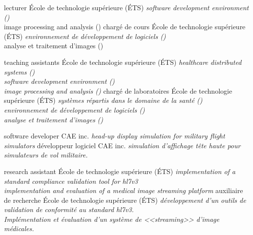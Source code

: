\documentclass[print]{friggeri-cv}
\begin{document}

\begin{entrylist}
  \engfr
  { {lecturer} {École de technologie supérieure {\scriptsize (ÉTS)}} {\emph{software development environment (\eleenv)}\\image processing and analysis (\eletr) }}
  { {chargé de cours} {École de technologie supérieure {\scriptsize (ÉTS)}} {\emph{environnement de développement de logiciels (\eleenv)}\\analyse et traitement d'images (\eletr)}}

  \engfr
  { {teaching assistants} {École de technologie supérieure {\scriptsize (ÉTS)}} {\emph{healthcare distributed systems (\gtssys)\\software development environment (\eleenv)\\image processing and analysis (\eletr)}}}
  { {chargé de laboratoires} {École de technologie supérieure {\scriptsize (ÉTS)}} {\emph{systèmes répartis dans le domaine de la santé (\gtssys)\\environnement de développement de logiciels (\eleenv)\\analyse et traitement d'images (\eletr)}}}

  \engfr
  { {software developer} {\scriptsize{CAE} inc.} {\emph{head-up display simulation for military flight simulators}}}
  { {développeur logiciel} {\scriptsize{CAE} inc.} {\emph{simulation d'affichage tête haute pour simulateurs de vol militaire.}}}

  \engfr
  { {research assistant} {École de technologie supérieure {\scriptsize (ÉTS)}} {\emph{implementation of a standard compliance validation tool for hl{\small7}v{\small3}\\implementation and evaluation of a medical image streaming platform}}}
  { {auxiliaire de recherche} {École de technologie supérieure {\scriptsize (ÉTS)}} {\emph{développement d'un outils de validation de conformité au standard hl{\small7}v{\small3}.\\Implémentation et évaluation d'un système de <<streaming>> d'image médicales.}}}
\end{entrylist}
\end{document}
